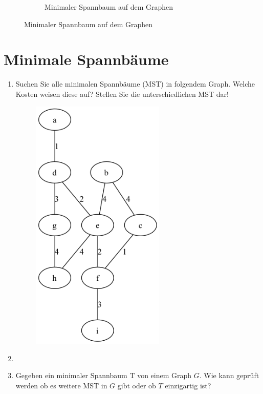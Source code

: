 \documentclass[a4paper,11pt]{report}
\begin{document}
\begin{figure}[htbp]
\begin{subfigure}[b]{0.3\textwidth}
            \caption{Minimaler Spannbaum auf dem Graphen}
            \label{fig:a02_graph_highlighted}
        \end{subfigure}
    \end{figure}

    \newpage

    \chapter{Minimale Spannbäume}
    \label{ch:minSb}
    \begin{enumerate}
        \item Suchen Sie alle minimalen Spannbäume (MST) in folgendem Graph.
        Welche Kosten weisen diese auf?
        Stellen Sie die unterschiedlichen MST dar!

        \begin{figure}[H]
            \centering
            \includegraphics[width=0.6\textwidth]{a03a_graph}
            \label{fig:a03_graph}
        \end{figure}
        \item
        \item Gegeben ein minimaler Spannbaum T von einem Graph $G$.
        Wie kann geprüft werden ob es weitere MST in $G$ gibt oder ob $T$ einzigartig ist?
    \end{enumerate}
\end{document}
